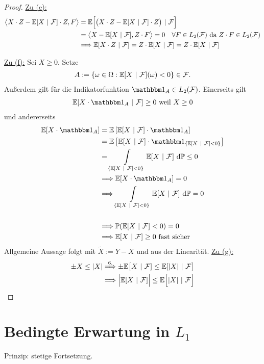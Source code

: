 \begin{proof}
\underline{Zu (e):} 
\begin{align*}
\big\langle X\cdot Z-\mathbb{E}[X~|~\mathcal{F}]\cdot Z,F\big\rangle
&=\mathbb{E}\Big[\big(X\cdot Z-\mathbb{E}[X~|~\mathcal{F}]\cdot Z\big)~|~\mathcal{F}\Big]\\
&=\big\langle X-\mathbb{E}[X~|~\mathcal{F}],Z\cdot F\big\rangle=0\quad\forall F\in L_2(\mathcal{F})\text{ da }Z\cdot F\in L_2(\mathcal{F})\\
&\Longrightarrow\mathbb{E}[X\cdot Z~|~\mathcal{F}]
=Z\cdot \mathbb{E}[X~|~\mathcal{F}]
=Z\cdot\mathbb{E}[X~|~\mathcal{F}]
\end{align*}

\underline{Zu (f):} Sei $X\geq0$. Setze
\begin{align*}
A:=\lbrace\omega\in\Omega:\mathbb{E}[X~|~\mathcal{F}](\omega)<0\rbrace\in\mathcal{F}.
\end{align*}
Außerdem gilt für die Indikatorfunktion $\indi_A\in L_2(\mathcal{F})$.
Einerseits gilt
\begin{align*}
\E[X\cdot\indi_A~|~\mathcal{F}]\geq0\text{ weil }X\geq0
\end{align*}
und andererseits
\begin{align*}
\E[X\cdot\indi_A]
&=\E\left[\E[X~|~\mathcal{F}]\cdot\indi_A\right]\\
&=\E\left[\E[X~|~\mathcal{F}]\cdot\indi_{\lbrace\E[X~|~\mathcal{F}]<0\rbrace}\right]\\
&=\int\limits_{\lbrace\E[X~|~\mathcal{F}]<0\rbrace} \E[X~|~\mathcal{F}]\d\P\leq0\\
&\Longrightarrow\E[X\cdot\indi_A]=0\\
&\Longrightarrow\int\limits_{\lbrace\E[X~|~\mathcal{F}]<0\rbrace} \E[X~|~\mathcal{F}]\d\P=0\\\\
&\Longrightarrow \P(\E[X~|~\mathcal{F}]<0)=0\\
&\Longrightarrow\E[X~|~\mathcal{F}]\geq0\text { fast sicher}
\end{align*}
Allgemeine Aussage folgt mit $\tilde{X}:=Y-X$ und aus der Linearität.\nl
\underline{Zu (g):}
\begin{align*}
\pm X\leq|X|
\stackrel{6.}{\Longrightarrow}
\pm\mathbb{E}\big[X~|~\mathcal{F}]\leq\mathbb{E}[|X|~|~\mathcal{F}\big]\\
\Longrightarrow\Big|\mathbb{E}[X~|~\mathcal{F}]\Big|\leq\mathbb{E}\Big[|X|~|~\mathcal{F}\Big]
\end{align*}
\end{proof}
 
\section{Bedingte Erwartung in \texorpdfstring{$L_1$}{L\_1}}
\setcounter{section}{1}
Prinzip: stetige Fortsetzung.

